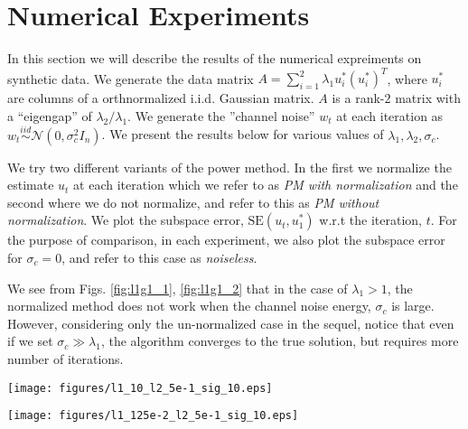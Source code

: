 \documentclass[10pt]{article}
\newcommand{\SE}{\mathrm{SE}}
\begin{document}
\color{black}



\clearpage
\null
\clearpage


\section{Numerical Experiments}
In this section we will describe the results of the numerical expreiments on synthetic data. We generate the data matrix $A = \sum_{i=1}^2 \lambda_1 u_i^* (u_i^*)^T$, where $u_i^*$ are columns of a orthnormalized i.i.d. Gaussian matrix. $A$ is a rank-$2$ matrix with a ``eigengap'' of $\lambda_2/\lambda_1$. We generate the ''channel noise'' $w_t$ at each iteration as $w_t \overset{iid}{\sim} \mathcal{N}(0, \sigma_c^2 I_n)$. We present the results below for various values of $\lambda_1, \lambda_2, \sigma_c$. 

We try two different variants of the power method. In the first we normalize the estimate $u_t$ at each iteration which we refer to as {\em PM with normalization} and the second where we do not normalize, and refer to this as {\em PM without normalization}. We plot the subspace error, $\SE(u_t, u_1^*)$ w.r.t the iteration, $t$. For the purpose of comparison, in each experiment, we also plot the subspace error for $\sigma_c = 0$, and refer to this case as {\em noiseless}. 

We see from Figs. \ref{fig:l1g1_1}, \ref{fig:l1g1_2} that in the case of $\lambda_1 > 1$, the normalized method does not work when the channel noise energy, $\sigma_c$ is large. However, considering only the un-normalized case in the sequel, notice that even if we set $\sigma_c \gg \lambda_1$, the algorithm converges to the true solution, but requires more number of iterations.

\begin{minipage}[t]{.5\linewidth}
\centering
\texttt{[image: figures/l1\_10\_l2\_5e-1\_sig\_10.eps]}
\label{fig:l1g1_1}
\end{minipage}%
\begin{minipage}[t]{.5\linewidth}
\centering
\texttt{[image: figures/l1\_125e-2\_l2\_5e-1\_sig\_10.eps]}
\label{fig:l1g1_2}
\end{minipage}
\end{document}

